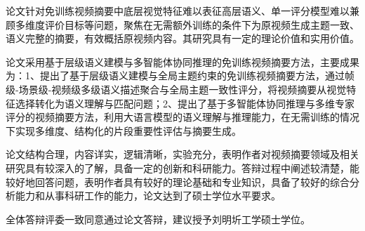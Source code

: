 
论文针对免训练视频摘要中底层视觉特征难以表征高层语义、单一评分模型难以兼顾多维度评价目标等问题，聚焦在无需额外训练的条件下为原视频生成主题一致、语义完整的摘要，有效概括原视频内容。其研究具有一定的理论价值和实用价值。

论文采用基于层级语义建模与多智能体协同推理的免训练视频摘要方法，主要成果为：1、提出了基于层级语义建模与全局主题约束的免训练视频摘要方法，通过帧级-场景级-视频级多级语义描述聚合与全局主题一致性评分，将视频摘要从视觉特征选择转化为语义理解与匹配问题；2、提出了基于多智能体协同推理与多维专家评分的视频摘要方法，利用大语言模型的语义理解与推理能力，在无需训练的情况下实现多维度、结构化的片段重要性评估与摘要生成。

论文结构合理，内容详实，逻辑清晰，实验充分，表明作者对视频摘要领域及相关研究具有较深入的了解，具备一定的创新和科研能力。答辩过程中阐述较清楚，能较好地回答问题，表明作者具有较好的理论基础和专业知识，具备了较好的综合分析能力和从事科研工作的能力，论文达到了硕士学位水平要求。

全体答辩评委一致同意通过论文答辩，建议授予刘明圻工学硕士学位。